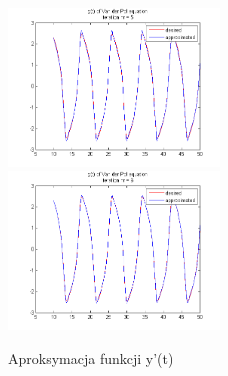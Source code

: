 \begin{figure}[ht!]
	\subfloat
	{\includegraphics[width=0.5\textwidth]
	{images/signal_iter5.png}}
	\subfloat
	{\includegraphics[width=0.5\textwidth]
	{images/signal_iter6.png}}	

	\caption{Aproksymacja funkcji y'(t)}		
	\label{fig:aproksymacja_x2}		
\end{figure}


